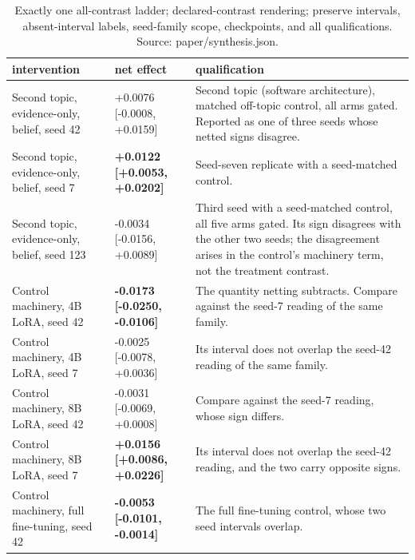 \documentclass[10pt]{article}
\begin{document}
\begin{table}[tbp]
\centering
\footnotesize
\caption{ Exactly one all-contrast ladder; declared-contrast rendering; preserve intervals, absent-interval labels, seed-family scope, checkpoints, and all qualifications. Source: paper/synthesis.json. }
\label{tab:contribution_ladder}



\begin{tabular}{ p{3.23cm}lp{8.61cm} }
\toprule
intervention & net effect & qualification \\
\midrule

Second topic, evidence-only, belief, seed 42 & +0.0076 [-0.0008, +0.0159] & Second topic (software architecture), matched off-topic control, all arms gated. Reported as one of three seeds whose netted signs disagree. \\

Second topic, evidence-only, belief, seed 7 & \textbf{ +0.0122 [+0.0053, +0.0202] } & Seed-seven replicate with a seed-matched control. \\

Second topic, evidence-only, belief, seed 123 & -0.0034 [-0.0156, +0.0089] & Third seed with a seed-matched control, all five arms gated. Its sign disagrees with the other two seeds; the disagreement arises in the control's machinery term, not the treatment contrast. \\

Control machinery, 4B LoRA, seed 42 & \textbf{ -0.0173 [-0.0250, -0.0106] } & The quantity netting subtracts. Compare against the seed-7 reading of the same family. \\

Control machinery, 4B LoRA, seed 7 & -0.0025 [-0.0078, +0.0036] & Its interval does not overlap the seed-42 reading of the same family. \\

Control machinery, 8B LoRA, seed 42 & -0.0031 [-0.0069, +0.0008] & Compare against the seed-7 reading, whose sign differs. \\

Control machinery, 8B LoRA, seed 7 & \textbf{ +0.0156 [+0.0086, +0.0226] } & Its interval does not overlap the seed-42 reading, and the two carry opposite signs. \\

Control machinery, full fine-tuning, seed 42 & \textbf{ -0.0053 [-0.0101, -0.0014] } & The full fine-tuning control, whose two seed intervals overlap. \\


\end{tabular}
\end{table}
\end{document}
